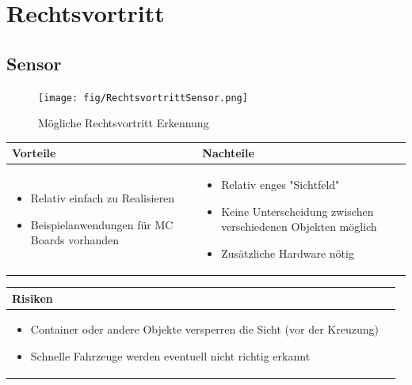 
\section{Rechtsvortritt}


\subsection{Sensor}

\begin{figure}[h]
	\centering
	\texttt{[image: fig/RechtsvortrittSensor.png]}
	\caption{Mögliche Rechtsvortritt Erkennung}
\end{figure}

\begin{table}[h]
\begin{tabular}{p{} | p{}}


 \textbf{Vorteile} & \textbf{Nachteile} \\ \hline
	 
\begin{itemize}
\item Relativ einfach zu Realisieren
\item Beispielanwendungen für MC Boards vorhanden 
\end{itemize}

 
 &
 
\begin{itemize}
\item Relativ enges "Sichtfeld"
\item Keine Unterscheidung zwischen verschiedenen Objekten möglich
\item Zusätzliche Hardware nötig
\end{itemize}

\end{tabular}
\end{table}

\begin{table}[h]
\begin{tabular}{p{}p{}}


 \textbf{Risiken} & \\ \hline
	 
\begin{itemize}
\item Container oder andere Objekte versperren die Sicht (vor der Kreuzung)
\item Schnelle Fahrzeuge werden eventuell nicht richtig erkannt
\end{itemize}


 
\end{tabular}
\end{table}

